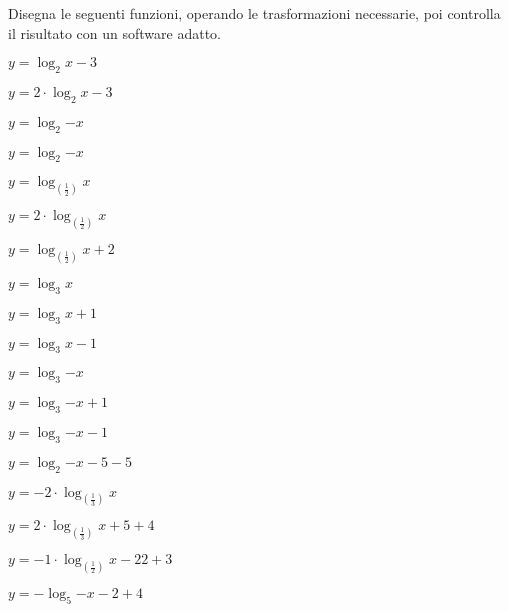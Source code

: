 \begin{esercizio}\label{ese:}
 Disegna le seguenti funzioni, operando le trasformazioni necessarie, 
 poi controlla il risultato con un software adatto.
\begin{multicols}{2}
 \begin{enumeratea}
  \item  \(y= \log_{2}{x}-3\)
  \item  \(y=2\cdot \log_{2}{x}-3\)
  \item  \(y= \log_{2}{-x}\)
  \item  \(y= \log_{2}{-x}\)
  \item  \(y=\log_{\left(\frac{1}{2}\right)}{x}\)
  \item  \(y=2 \cdot \log_{\left(\frac{1}{2}\right)}{x}\)
  \item  \(y=\log_{\left(\frac{1}{2}\right)}{x}+2\)
  \item  \(y=\log_{3}{x}\)
  \item  \(y=\log_{3}{x+1}\)
  \item  \(y=\log_{3}{x-1}\)
  \item  \(y=\log_{3}{-x}\)
  \item  \(y=\log_{3}{-x+1}\)
  \item  \(y=\log_{3}{-x-1}\)
  \item  \(y=\log_{2}{-x-5} -5\)
  \item  \(y=-2 \cdot \log_{\left(\frac{1}{3}\right)}{x}\)
  \item  \(y=2 \cdot \log_{\left(\frac{1}{3}\right)}{x+5} +4\)
  \item  \(y=-1 \cdot \log_{\left(\frac{1}{2}\right)}{x-22} +3\)
  \item  \(y=- \log_{5}{-x-2} +4\)

\end{enumeratea}
\end{multicols}
\end{esercizio}
